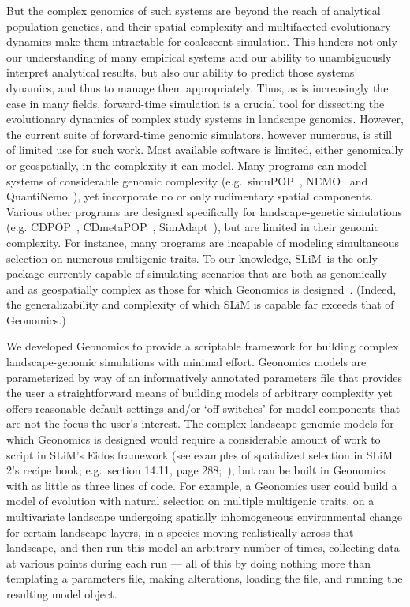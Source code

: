 ﻿\documentclass{article}
\begin{document}
But the complex genomics of such systems are beyond the reach of analytical
population genetics, and their spatial complexity and multifaceted evolutionary
dynamics make them intractable for coalescent simulation.
This hinders not only our understanding of many empirical systems and our ability to
unambiguously interpret analytical results, but also our
ability to predict those systems' dynamics, and thus to manage them appropriately.
Thus, as is increasingly the case in many fields, forward-time simulation is a 
crucial tool for dissecting the evolutionary dynamics of complex study systems in landscape genomics.
However, the current suite of forward-time genomic simulators, however numerous, is still of limited use for such work.
Most available software is limited, either genomically or geospatially, in the complexity it can model.
Many programs can model systems of considerable genomic complexity
(e.g.\ simuPOP~\cite{peng}, NEMO~\cite{guillaume} and QuantiNemo~\cite{neuenschwander}),
yet incorporate no or only rudimentary spatial components.
Various other programs are designed specifically for landscape-genetic simulations
(e.g. CDPOP~\cite{landguth}, CDmetaPOP~\cite{landguth2}, SimAdapt~\cite{rebaudo}),
but are limited in their genomic complexity.
For instance, many programs are incapable of modeling simultaneous selection on numerous multigenic traits.
To our knowledge, SLiM~\cite{messer,haller}is the only package currently capable of simulating scenarios
that are both as genomically and as geospatially complex as those for which Geonomics is designed~\cite{popgen_models}.
(Indeed, the generalizability and complexity of which SLiM is capable far exceeds that of Geonomics.)

We developed Geonomics to provide a scriptable framework for building
complex landscape-genomic simulations with minimal effort.
Geonomics models are parameterized by way of an informatively annotated parameters file
that provides the user a straightforward means of building models of arbitrary complexity yet offers
reasonable default settings and/or `off switches' for model components that are not the focus the user's interest.
The complex landscape-genomic models for which Geonomics is designed would require a considerable amount
of work to script in SLiM's Eidos framework (see examples of spatialized selection in SLiM 2's recipe book;
e.g.\ section 14.11, page 288;~\cite{slim_manual}), but can be built in Geonomics with as little as three lines of code.
For example, a Geonomics user could build a model of evolution with natural selection
on multiple multigenic traits, on a multivariate landscape undergoing spatially inhomogeneous
environmental change for certain landscape layers, in a species moving realistically across that landscape,
and then run this model an arbitrary number of times, collecting data at various points during each
run --- all of this by doing nothing more than templating a parameters file, making alterations,
loading the file, and running the resulting model object.
\end{document}

